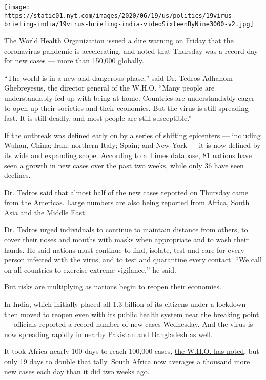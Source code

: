 \texttt{[image: https://static01.nyt.com/images/2020/06/19/us/politics/19virus-briefing-india/19virus-briefing-india-videoSixteenByNine3000-v2.jpg]}

The World Health Organization issued a dire warning on Friday that the
coronavirus pandemic is accelerating, and noted that Thursday was a
record day for new cases --- more than 150,000 globally.

``The world is in a new and dangerous phase,'' said Dr. Tedros Adhanom
Ghebreyesus, the director general of the W.H.O. ``Many people are
understandably fed up with being at home. Countries are understandably
eager to open up their societies and their economies. But the virus is
still spreading fast. It is still deadly, and most people are still
susceptible.''

If the outbreak was defined early on by a series of shifting epicenters
--- including Wuhan, China; Iran; northern Italy; Spain; and New York
--- it is now defined by its wide and expanding scope. According to a
Times database,
\href{https://www.nytimes.com/interactive/2020/world/coronavirus-maps.html}{81
nations have seen a growth in new cases} over the past two weeks, while
only 36 have seen declines.

Dr. Tedros said that almost half of the new cases reported on Thursday
came from the Americas. Large numbers are also being reported from
Africa, South Asia and the Middle East.

Dr. Tedros urged individuals to continue to maintain distance from
others, to cover their noses and mouths with masks when appropriate and
to wash their hands. He said nations must continue to find, isolate,
test and care for every person infected with the virus, and to test and
quarantine every contact. ``We call on all countries to exercise extreme
vigilance,'' he said.

But risks are multiplying as nations begin to reopen their economies.

In India, which initially placed all 1.3 billion of its citizens under a
lockdown --- then
\href{https://www.nytimes.com/2020/06/10/world/asia/reopening-before-coronavirus-ends.html}{moved
to reopen} even with its public health system near the breaking point
--- officials reported a record number of new cases Wednesday. And the
virus is now spreading rapidly in nearby Pakistan and Bangladesh as
well.

It took Africa nearly 100 days to reach 100,000 cases,
\href{https://www.who.int/docs/default-source/coronaviruse/situation-reports/20200617-covid-19-sitrep-149.pdf?sfvrsn=3b3137b0_4}{the
W.H.O. has noted,} but only 19 days to double that tally. South Africa
now averages a thousand more new cases each day than it did two weeks
ago.

